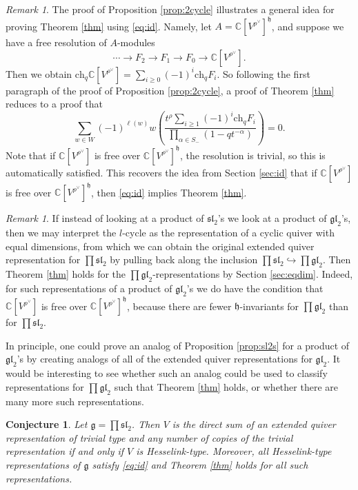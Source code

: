 \documentclass[12pt]{article}
\newcommand{\C}{\mathbb{C}}
\renewcommand{\sl}{\mathfrak{sl}}
\newtheorem{conjecture}[theorem]{Conjecture}
\theoremstyle{definition}
\theoremstyle{remark}
\newtheorem{remark}[theorem]{Remark}
\newcommand{\g}{\mathfrak{g}}
\newcommand{\ch}{\mathrm{ch}}
\newcommand{\h}{\mathfrak{h}}
\newcommand{\gl}{\mathfrak{gl}}
\begin{document}
\begin{remark}\label{rem:resolution}
    The proof of Proposition \ref{prop:2cycle} illustrates a general idea for proving Theorem \ref{thm} using \eqref{eq:id}. Namely, let $A=\C[V^{\rho^\vee}]^\h$, and suppose we have a free resolution of $A$-modules
    \[\cdots\to F_2\to F_1\to F_0\to\C[V^{\rho^\vee}].\]
    Then we obtain $\ch_q\C[V^{\rho^\vee}]=\sum_{i\geq 0}(-1)^i\ch_qF_i$. So following the first paragraph of the proof of Proposition \ref{prop:2cycle}, a proof of Theorem \ref{thm} reduces to a proof that
    \[\sum_{w\in W}(-1)^{\ell(w)}w\left(\frac{t^\rho\sum_{i\geq 1}(-1)^i\ch_qF_i}{\prod_{\alpha\in S_-}(1-qt^{-\alpha})}\right)=0.\]
    Note that if $\C[V^{\rho^\vee}]$ is free over $\C[V^{\rho^\vee}]^\h$, the resolution is trivial, so this is automatically satisfied. This recovers the idea from Section \ref{sec:id} that if $\C[V^{\rho^\vee}]$ is free over $\C[V^{\rho^\vee}]^\h$, then \eqref{eq:id} implies Theorem \ref{thm}.
\end{remark}

\begin{remark}
    If instead of looking at a product of $\sl_2$'s we look at a product of $\gl_2$'s, then we may interpret the $l$-cycle as the representation of a cyclic quiver with equal dimensions, from which we can obtain the original extended quiver representation for $\prod\sl_2$ by pulling back along the inclusion $\prod\sl_2\hookrightarrow\prod\gl_2$. Then Theorem \ref{thm} holds for the $\prod\gl_2$-representations by Section \ref{sec:eqdim}. Indeed, for such representations of a product of $\gl_2$'s we do have the condition that $\C[V^{\rho^\vee}]$ is free over $\C[V^{\rho^\vee}]^\h$, because there are fewer $\h$-invariants for $\prod\gl_2$ than for $\prod\sl_2$.

    In principle, one could prove an analog of Proposition \ref{prop:sl2s} for a product of $\gl_2$'s by creating analogs of all of the extended quiver representations for $\gl_2$. It would be interesting to see whether such an analog could be used to classify representations for $\prod\gl_2$ such that Theorem \ref{thm} holds, or whether there are many more such representations.
\end{remark}

\begin{conjecture}
    Let $\g=\prod\sl_2$. Then $V$ is the direct sum of an extended quiver representation of trivial type and any number of copies of the trivial representation if and only if $V$ is Hesselink-type. Moreover, all Hesselink-type representations of $\g$ satisfy \eqref{eq:id} and Theorem \ref{thm} holds for all such representations.
\end{conjecture}
\end{document}
